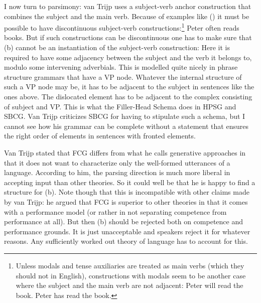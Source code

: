 I now turn to parsimony: van Trijp uses a subject-verb anchor construction that combines the subject
and the main verb. Because of examples like () it must be possible to have discontinuous subject-verb constructions:\footnote{
  Unless modals and tense auxiliaries are treated as main verbs (which they should not in English), constructions with
  modals seem to be another case where the subject and the main verb are not adjacent:
  \eal
  \ex Peter will read the book.
  \ex Peter has read the book.
  \zllast
} 
\ea
Peter often reads books.
\z
But if such constructions can be discontinuous one has to make sure that (b) cannot be an
instantiation of the subject-verb construction:
\eal
{}
\zl
Here it is required to have some adjacency between the subject and the verb it belongs to, modulo
some intervening adverbials. This is modelled quite nicely in phrase structure grammars that have a
VP node. Whatever the internal structure of such a VP node may be, it has to be adjacent to the
subject in sentences like the ones above. The dislocated element has to be adjacent to the complex
consisting of subject and VP. This is what the Filler-Head Schema does in HPSG and SBCG. Van Trijp
criticizes SBCG for having to stipulate such a schema, but I cannot see how his grammar can be
complete without a statement that ensures the right order of elements in sentences with fronted
elements.

Van Trijp stated that FCG differs from what he calls generative approaches in that it does not want
to characterize only the well-formed utterances of a language. According to him, the parsing direction
 is much more liberal in accepting input than other theories. So it could well be that he
is happy to find a structure for (b). Note though that this is incompatible with other claims
made by van Trijp: he argued that FCG is superior to other theories in that it comes with a performance
model (or rather in not separating competence from performance at all). But then (b) should be
rejected both on competence and performance grounds. It is just unacceptable and speakers reject it
for whatever reasons. Any sufficiently worked out theory of language has to account for this.

